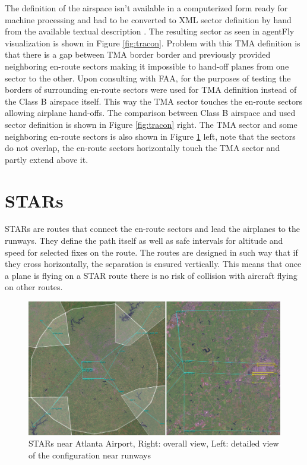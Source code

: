 The definition of the airspace isn't available in a computerized form ready for machine processing and had to be converted to XML sector definition by hand from the available textual description \cite{atlanta-tma}. The resulting sector as seen in agentFly visualization is shown in Figure \ref{fig:tracon}. Problem with this TMA definition is that there is a gap between TMA border border and previously provided neighboring en-route sectors making it impossible to hand-off planes from one sector to the other. Upon consulting with FAA, for the purposes of testing the borders of surrounding en-route sectors were used for TMA definition  instead of the Class B airspace itself. This way the TMA sector touches the en-route sectors allowing airplane hand-offs. The comparison between Class B airspace and used sector definition is shown in Figure \ref{fig:tracon} right. The TMA sector and some neighboring en-route sectors is also shown in Figure \ref{fig:routes} left, note that the sectors do not overlap, the en-route sectors horizontally touch the TMA sector and partly extend above it.

\section{STARs}

STARs are routes that connect the en-route sectors and lead the airplanes to the runways. They define the path itself as well as safe intervals for altitude and speed for selected fixes on the route. The routes are designed in such way that if they cross horizontally, the separation is ensured vertically. This means that once a plane is flying on a STAR route there is no risk of collision with aircraft flying on other routes.

\begin{figure}[h]
    \centering
    \includegraphics[width=\textwidth]{figures/routes.png}
    \caption{STARs near Atlanta Airport, Right: overall view, Left: detailed view of the configuration near runways}
    \label{fig:routes}
\end{figure}

